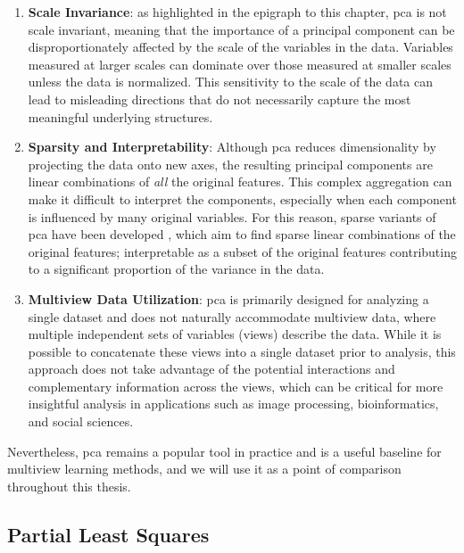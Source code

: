 \begin{enumerate}
    \item \textbf{Scale Invariance}: as highlighted in the epigraph to this chapter, \acrshort{pca} is not scale invariant, meaning that the importance of a principal component can be disproportionately affected by the scale of the variables in the data. Variables measured at larger scales can dominate over those measured at smaller scales unless the data is normalized. This sensitivity to the scale of the data can lead to misleading directions that do not necessarily capture the most meaningful underlying structures.

    \item \textbf{Sparsity and Interpretability}: Although \acrshort{pca} reduces dimensionality by projecting the data onto new axes, the resulting principal components are linear combinations of \textit{all} the original features. This complex aggregation can make it difficult to interpret the components, especially when each component is influenced by many original variables. For this reason, sparse variants of \acrshort{pca} have been developed \citep{zou2006sparse,zou2018selective}, which aim to find sparse linear combinations of the original features; interpretable as a subset of the original features contributing to a significant proportion of the variance in the data.

    \item \textbf{Multiview Data Utilization}: \acrshort{pca} is primarily designed for analyzing a single dataset and does not naturally accommodate multiview data, where multiple independent sets of variables (views) describe the data. While it is possible to concatenate these views into a single dataset prior to analysis, this approach does not take advantage of the potential interactions and complementary information across the views, which can be critical for more insightful analysis in applications such as image processing, bioinformatics, and social sciences.
\end{enumerate}

Nevertheless, \acrshort{pca} remains a popular tool in practice \citep{greenacre2022principal} and is a useful baseline for multiview learning methods, and we will use it as a point of comparison throughout this thesis.

\subsection{Partial Least Squares}

